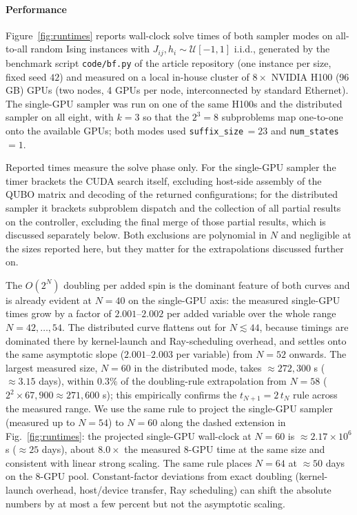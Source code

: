 \documentclass[preprint,12pt,a4paper]{elsarticle}
\begin{document}
\paragraph{Performance}
Figure~\ref{fig:runtimes} reports wall-clock solve times of both sampler modes on
all-to-all random Ising instances with $J_{ij},h_i\sim \mathcal{U}[-1,1]$ i.i.d.,
generated by the benchmark script \texttt{code/bf.py} of the article repository
(one instance per size, fixed seed $42$) and measured on a local
in-house cluster of $8\times$ NVIDIA H100 (96\,GB) GPUs (two nodes, 4 GPUs per
node, interconnected by standard Ethernet). The single-GPU sampler was run on one
of the same H100s and the distributed sampler on all eight, with $k=3$ so that
the $2^{3}=8$ subproblems map one-to-one onto the available GPUs; both modes used
\texttt{suffix\_size}\,$=23$ and \texttt{num\_states}\,$=1$.

Reported times measure the solve phase only. For the single-GPU sampler the timer
brackets the CUDA search itself, excluding host-side assembly of the QUBO matrix
and decoding of the returned configurations; for the distributed sampler it
brackets subproblem dispatch and the collection of all partial results on the
controller, excluding the final merge of those partial results, which is
discussed separately below. Both exclusions are polynomial in $N$ and negligible
at the sizes reported here, but they matter for the extrapolations discussed
further on.

The $O(2^N)$ doubling per added spin is the dominant feature of both curves and
is already evident at $N=40$ on the single-GPU axis: the measured single-GPU
times grow by a factor of $2.001$--$2.002$ per added variable over the whole
range $N=42,\dots,54$. The distributed curve flattens out for $N \lesssim 44$,
because timings are dominated there by kernel-launch and Ray-scheduling overhead,
and settles onto the same asymptotic slope ($2.001$--$2.003$ per variable) from
$N=52$ onwards. The largest measured size, $N=60$ in the distributed mode, takes
$\approx\!272{,}300$ s ($\approx 3.15$ days), within $0.3\%$ of the
doubling-rule extrapolation from $N=58$ ($2^{2}\!\times\!67{,}900 \approx
271{,}600$ s); this empirically confirms the $t_{N+1}=2\,t_N$ rule across the
measured range. We use the same rule to project the single-GPU sampler (measured
up to $N=54$) to $N=60$ along the dashed extension in Fig.~\ref{fig:runtimes}:
the projected single-GPU wall-clock at $N=60$ is $\approx\!2.17\times 10^{6}$ s
($\approx\!25$ days), about $8.0\times$ the measured 8-GPU time at the same size
and consistent with linear strong scaling. The same rule places $N=64$ at
$\approx\!50$ days on the 8-GPU pool. Constant-factor deviations from exact
doubling (kernel-launch overhead, host/device transfer, Ray scheduling) can shift
the absolute numbers by at most a few percent but not the asymptotic scaling.
\end{document}
